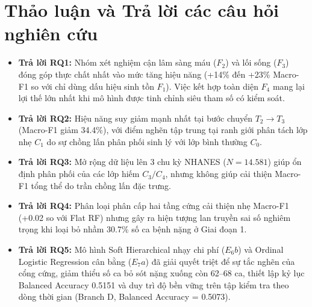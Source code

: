 \section{Thảo luận và Trả lời các câu hỏi nghiên cứu}
\label{sec:thao-luan-rq}

\begin{itemize}
    \item \textbf{Trả lời RQ1:} Nhóm xét nghiệm cận lâm sàng máu ($F_2$) và lối sống ($F_3$) đóng góp thực chất nhất vào mức tăng hiệu năng (+14\% đến +23\% Macro-F1 so với chỉ dùng dấu hiệu sinh tồn $F_1$). Việc kết hợp toàn diện $F_4$ mang lại lợi thế lớn nhất khi mô hình được tinh chỉnh siêu tham số có kiểm soát.
    \item \textbf{Trả lời RQ2:} Hiệu năng suy giảm mạnh nhất tại bước chuyển $T_2 \to T_3$ (Macro-F1 giảm 34.4\%), với điểm nghẽn tập trung tại ranh giới phân tách lớp nhẹ $C_1$ do sự chồng lấn phân phối sinh lý với lớp bình thường $C_0$.
    \item \textbf{Trả lời RQ3:} Mở rộng dữ liệu lên 3 chu kỳ NHANES ($N = 14.581$) giúp ổn định phân phối của các lớp hiếm $C_3/C_4$, nhưng không giúp cải thiện Macro-F1 tổng thể do trần chồng lấn đặc trưng.
    \item \textbf{Trả lời RQ4:} Phân loại phân cấp hai tầng cứng cải thiện nhẹ Macro-F1 (+0.02 so với Flat RF) nhưng gây ra hiện tượng lan truyền sai số nghiêm trọng khi loại bỏ nhầm 30.7\% số ca bệnh nặng ở Giai đoạn 1.
    \item \textbf{Trả lời RQ5:} Mô hình Soft Hierarchical nhạy chi phí ($E_6b$) và Ordinal Logistic Regression cân bằng ($E_7a$) đã giải quyết triệt để sự tắc nghẽn của cổng cứng, giảm thiểu số ca bỏ sót nặng xuống còn 62--68 ca, thiết lập kỷ lục Balanced Accuracy 0.5151 và duy trì độ bền vững trên tập kiểm tra theo dòng thời gian (Branch D, Balanced Accuracy = 0.5073).
\end{itemize}
\cleardoublepage
